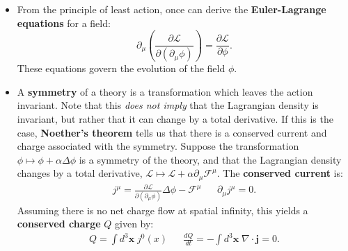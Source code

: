 \documentclass[12pt, oneside]{article}   	%
\theoremstyle{definition}
\begin{document}
\begin{itemize}
	\item From the principle of least action, once can derive the \textbf{Euler-Lagrange equations} for a field:
	\begin{equation}
		\partial_\mu \left(\frac{\partial \mathcal{L}}{\partial (\partial_\mu\phi)}\right) = \frac{\partial\mathcal L}{\partial\phi}.
	\end{equation}
	These equations govern the evolution of the field $\phi$. %
	
	\item A \textbf{symmetry} of a theory is a transformation which leaves the action invariant. Note that this \textit{does not imply} that the Lagrangian density is invariant, but rather that it can change by a total derivative. If this is the case, \textbf{Noether's theorem} tells us that there is a conserved current and charge associated with the symmetry. Suppose the transformation $\phi\mapsto \phi + \alpha\Delta\phi$ is a symmetry of the theory, and that the Lagrangian density changes by a total derivative, $\mathcal L\mapsto \mathcal L + \alpha\partial_\mu\mathcal{F}^\mu$. The \textbf{conserved current} is:
	\begin{align}
		j^\mu = \frac{\partial\mathcal L}{\partial(\partial_\mu\phi)} \Delta\phi - \mathcal F^\mu && \partial_\mu j^\mu = 0.
	\end{align}
	Assuming there is no net charge flow at spatial infinity, this yields a \textbf{conserved charge} $Q$ given by:
	\begin{align}
		Q = \int d^3\bm x \; j^0(x) && \frac{dQ}{dt} = -\int d^3\bm x \; \nabla\cdot \bm j = 0.
	\end{align}
	

\end{itemize}
\end{document}
